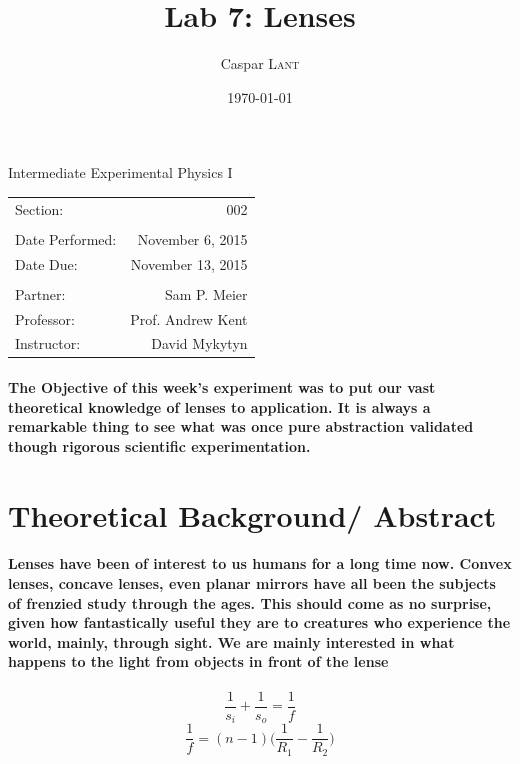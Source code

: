 \documentclass{amsart}
\title{Lab 7: Lenses}
\author{Caspar \textsc{Lant}} %
\date{\today} %
\begin{document}
\bigskip

\maketitle %
\begin{center}

Intermediate Experimental Physics I\\
\vspace{1.5cm}
\begin{tabular}{|l r|}
\hline
Section: & 002\\
&\\
Date Performed: & November 6, 2015 \\ %
Date Due: & November 13, 2015\\
&\\
Partner: & Sam P. Meier \\ %
Professor: & Prof. Andrew Kent\\
Instructor: & David Mykytyn\\ %
\hline
\end{tabular}
\end{center}
\vspace{50mm}
\pagebreak

\paragraph{\textbf{The Objective} of this week's experiment was to put our vast theoretical knowledge of lenses to application. It is always a remarkable thing to see what was once pure abstraction validated though rigorous scientific experimentation. }
\section{Theoretical Background/ Abstract}
\paragraph{Lenses have been of interest to us humans for a long time now. Convex lenses, concave lenses, even planar mirrors have all been the subjects of frenzied study through the ages. This should come as no surprise, given how fantastically useful they are to creatures who experience the world, mainly, through sight. We are mainly interested in what happens to the light from objects in front of the lense }
\begin{equation}
\frac{1}{s_i}+ \frac{1}{s_o} = \frac{1}{f}
\end{equation}
\begin{equation}
\frac{1}{f} = (n-1)\Big(\frac{1}{R_1} - \frac{1}{R_2}\Big)
\end{equation}
\end{document}
